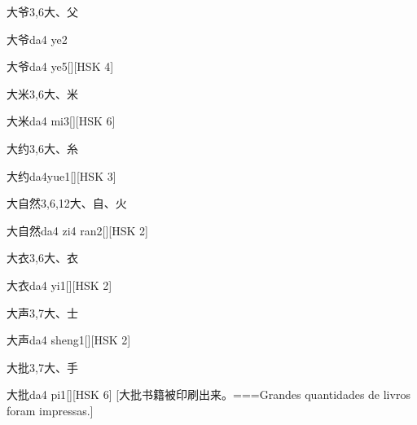 \begin{Entry}{大爷}{3,6}{⼤、⽗}
  \begin{Phonetics}{大爷}{da4 ye2}
  \end{Phonetics}
  \begin{Phonetics}{大爷}{da4 ye5}[][HSK 4]
  \end{Phonetics}
\end{Entry}

\begin{Entry}{大米}{3,6}{⼤、⽶}
  \begin{Phonetics}{大米}{da4 mi3}[][HSK 6]
  \end{Phonetics}
\end{Entry}

\begin{Entry}{大约}{3,6}{⼤、⽷}
  \begin{Phonetics}{大约}{da4yue1}[][HSK 3]
  \end{Phonetics}
\end{Entry}

\begin{Entry}{大自然}{3,6,12}{⼤、⾃、⽕}
  \begin{Phonetics}{大自然}{da4 zi4 ran2}[][HSK 2]
  \end{Phonetics}
\end{Entry}

\begin{Entry}{大衣}{3,6}{⼤、⾐}
  \begin{Phonetics}{大衣}{da4 yi1}[][HSK 2]
  \end{Phonetics}
\end{Entry}

\begin{Entry}{大声}{3,7}{⼤、⼠}
  \begin{Phonetics}{大声}{da4 sheng1}[][HSK 2]
  \end{Phonetics}
\end{Entry}

\begin{Entry}{大批}{3,7}{⼤、⼿}
  \begin{Phonetics}{大批}{da4 pi1}[][HSK 6]
    [大批书籍被印刷出来。===Grandes quantidades de livros foram impressas.]
  \end{Phonetics}
\end{Entry}

